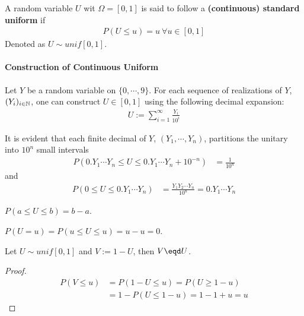 \documentclass{article}
\begin{document}
   	\begin{definition}
   		A random variable $U$ wit $\Omega = [0, 1]$ is said to follow a \textbf{(continuous) standard uniform} if 
   		\begin{align}
   			P(U \leq u) = u\ \forall u \in [0, 1]	
   		\end{align}
   		Denoted as $U \sim unif[0, 1]$.
   	\end{definition}
   	
   	\paragraph{Construction of Continuous Uniform} Let $Y$ be a random variable on $\{0, \cdots, 9\}$. For each sequence of realizations of $Y$, $(Y_i)_{i \in \mathbb{N}}$, one can construct $U \in [0, 1]$ using the following decimal expansion:
   	\begin{align}
   		U := \sum_{i=1}^\infty \frac{Y_i}{10^i}
   	\end{align}
   	
   	\begin{proposition}
   		It is evident that each finite decimal  of $Y$, $(Y_1, \cdots, Y_n)$, partitions the unitary into $10^n$ small intervals 
   		\begin{align}
   			P(0.Y_1\cdots Y_n \leq U \leq 0.Y_1\cdots Y_n + 10^{-n}) &= \frac{1}{10^n}
   		\end{align}
   		and 
   		\begin{align}
   			P(0 \leq U \leq 0.Y_1\cdots Y_n) &= \frac{Y_1 Y_2 \cdots Y_n}{10^n} = 0.Y_1\cdots Y_n
   		\end{align}
   	\end{proposition}
   	
   	\begin{proposition}
   		$P(a \leq U \leq b) = b - a$.
   	\end{proposition}
   	
   	\begin{corollary}
   		$P(U = u) = P(u \leq U \leq u) = u - u = 0$.
   	\end{corollary}
   	
   	\begin{proposition}
   		Let $U \sim unif[0, 1]$ and $V:=1-U$, then $V \eqd U$.
   	\end{proposition}
   	
   	\begin{proof}
   		\begin{align}
   			P(V \leq u) &= P(1 - U \leq u) 
   			= P(U \geq 1 - u) \\
   			&= 1 - P(U \leq 1 - u)
   			= 1 - 1 + u = u
   		\end{align}
   	\end{proof}
   	
\end{document}
